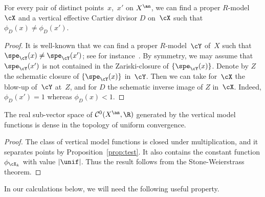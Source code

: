 \begin{prop}\label{prop:test}
For every pair of distinct points~$x$,~$x'$ on $X^{\an}$, we can find a proper $R$\nobreakdash-model~$\cX$ and a vertical effective Cartier divisor $D$ on~$\cX$ such that $\phi_D(x)\neq \phi_D(x')$.
\end{prop}
\begin{proof}
It is well-known that we can find a proper $R$\nobreakdash-model~$\cY$ of~$X$ such that $\spe_{\cY}(x)\neq \spe_{\cY}(x')$; see for instance~\cite[2.3.2]{MuNi}.
By symmetry, we may assume that $\spe_{\cY}(x')$ is not contained in the Zariski-closure of $\{\spe_{\cY}(x)\}$. Denote by $Z$ the schematic closure of $\{\spe_{\cY}(x)\}$ in~$\cY$. Then we can take for~$\cX$ the blow-up of~$\cY$ at~$Z$, and for $D$ the schematic inverse image of $Z$ in~$\cX$. Indeed, $\phi_D(x')=1$ whereas $\phi_D(x)<1$.
\end{proof}
\begin{cor}\label{cor:stone}
The real sub-vector space of $\mathcal{C}^0(X^{\an},\R)$ generated by the vertical model functions
is dense in the topology of uniform convergence.
\end{cor}
\begin{proof}
The class of vertical model functions is closed under multiplication, and it separates points by
Proposition~\ref{prop:test}. It also contains the constant function $\phi_{\cX_k}$ with value $|\unif|$.
Thus the result follows from the Stone-Weierstrass theorem.
\end{proof}

In our calculations below, we will need the following useful property.

